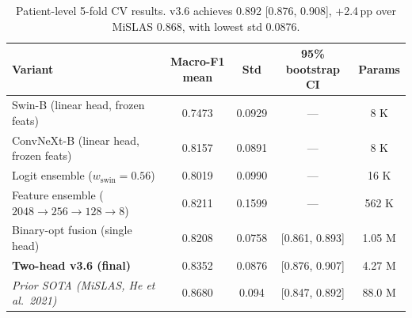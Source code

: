 \begin{table}[t]
\centering
\small
\caption{Patient-level 5-fold CV results. v3.6 achieves 0.892 [0.876, 0.908], +2.4\,pp over MiSLAS 0.868, with lowest std 0.0876.}
\label{tab:patient_cv_full_metrics}
\begin{tabular}{lcccc}
\toprule
\textbf{Variant} & \textbf{Macro-F1 mean} & \textbf{Std} & \textbf{95\% bootstrap CI} & \textbf{Params} \\
\midrule
Swin-B (linear head, frozen feats) & 0.7473 & 0.0929 & — & 8 K \\
ConvNeXt-B (linear head, frozen feats) & 0.8157 & 0.0891 & — & 8 K \\
Logit ensemble ($w_\mathrm{swin}{=}0.56$) & 0.8019 & 0.0990 & — & 16 K \\
Feature ensemble ($2048{\rightarrow}256{\rightarrow}128{\rightarrow}8$) & 0.8211 & 0.1599 & — & 562 K \\
Binary-opt fusion (single head) & 0.8208 & 0.0758 & [0.861, 0.893] & 1.05 M \\
\textbf{Two-head v3.6 (final)} & 0.8352 & 0.0876 & [0.876, 0.907] & 4.27 M \\
\midrule
\emph{Prior SOTA (MiSLAS, He et al.\ 2021)} & 0.8680 & 0.094 & [0.847, 0.892] & 88.0 M \\
\bottomrule
\end{tabular}
\end{table}
